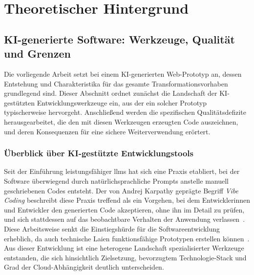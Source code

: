 \chapter{Theoretischer Hintergrund}
\label{ch:hintergrund}
\section{KI-generierte Software: Werkzeuge, Qualität und Grenzen}
\label{sec:ki-generierte-software}
Die vorliegende Arbeit setzt bei einem KI-generierten Web-Prototyp an, dessen Entstehung und Charakteristika für das gesamte Transformationsvorhaben grundlegend sind.
Dieser Abschnitt ordnet zunächst die Landschaft der KI-gestützten Entwicklungswerkzeuge ein, aus der ein solcher Prototyp typischerweise hervorgeht.
Anschließend werden die spezifischen Qualitätsdefizite herausgearbeitet, die den mit diesen Werkzeugen erzeugten Code auszeichnen, und deren Konsequenzen für eine sichere Weiterverwendung erörtert.
\subsection{Überblick über KI-gestützte Entwicklungstools}
\label{sec:ueberblick-ki-tools}
Seit der Einführung leistungsfähiger \glspl{llm} hat sich eine Praxis etabliert, bei der Software überwiegend durch natürlichsprachliche Prompts anstelle manuell geschriebenen Codes entsteht.
Der von Andrej Karpathy geprägte Begriff \emph{Vibe Coding} beschreibt diese Praxis treffend als ein Vorgehen, bei dem Entwicklerinnen und Entwickler den generierten Code akzeptieren, ohne ihn im Detail zu prüfen, und sich stattdessen auf das beobachtbare Verhalten der Anwendung verlassen~\cite{Wikipedia2026VibeCoding}.
Diese Arbeitsweise senkt die Einstiegshürde für die Softwareentwicklung erheblich, da auch technische Laien funktionsfähige Prototypen erstellen können~\cite{edwards2025vibecoding}.
Aus dieser Entwicklung ist eine heterogene Landschaft spezialisierter Werkzeuge entstanden, die sich hinsichtlich Zielsetzung, bevorzugtem Technologie-Stack und Grad der Cloud-Abhängigkeit deutlich unterscheiden.

